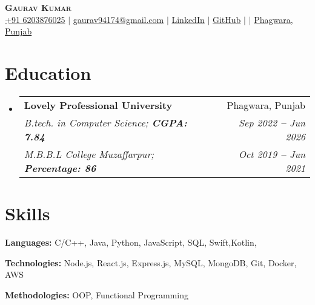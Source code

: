 \documentclass[letterpaper,11pt]{article}
\makeatletter
\newcommand{\resumeEducationHeading}[6]{
  \vspace{-2pt}\item
    \begin{tabular*}{0.97\textwidth}[t]{l@{\extracolsep{\fill}}r}
      \textbf{#1} & #2 \\
      \textit{\small#3} & \textit{\small #4} \\
      \textit{\small#5} & \textit{\small #6} \\
    \end{tabular*}\vspace{-5pt}
}
\newcommand{\resumeSubHeadingListStart}{\begin{itemize}[leftmargin=0.15in, label={}]}
\newcommand{\resumeSubHeadingListEnd}{\end{itemize}}
\makeatother
\begin{document}

\begin{center}
    \textbf{\Huge \scshape Gaurav Kumar} \\ \vspace{3pt}
    \small
    \faMobile \hspace{.5pt} \href{tel:6203876025}{+91 6203876025}
    $|$
    \faAt \hspace{.5pt} \href{mailto:gaurav94174@gmail.com}{gaurav94174@gmail.com}
    $|$
    \faLinkedinSquare \hspace{.5pt} \href{https://www.linkedin.com/in/gaurav94/}{LinkedIn}
    $|$
    \faGithub \hspace{.5pt} \href{https://github.com/Gaurav012221842}{GitHub}
    $|$
    $|$
    \faMapMarker \hspace{.5pt} \href{ }{Phagwara, Punjab}
\end{center}




\section{Education}
  \vspace{3pt}
  \resumeSubHeadingListStart
    
    \resumeEducationHeading
      {Lovely Professional University
      }{Phagwara, Punjab}
      {B.tech. in Computer Science;   \textbf{CGPA: 7.84 }}{Sep 2022 \textbf{--} Jun 2026}
      {M.B.B.L College Muzaffarpur;
      \textbf{Percentage: 86}}{Oct 2019 \textbf{--} Jun 2021}
       
    
  \resumeSubHeadingListEnd




\section{Skills}
  \vspace{2pt}
  \resumeSubHeadingListStart
    \small{\item{
        
        \textbf{Languages:}{ C/C++, Java, Python, JavaScript, SQL, Swift,Kotlin, } \\ \vspace{3pt}
        
        \textbf{Technologies:}{   Node.js, React.js, Express.js, MySQL, MongoDB, Git,  Docker, AWS} \\ \vspace{3pt}
        
        \textbf{Methodologies:}{  OOP, Functional Programming} \\ \vspace{3pt}
        
    }}
  \resumeSubHeadingListEnd
\end{document}
